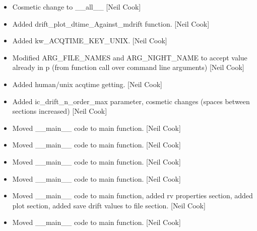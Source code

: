 \documentclass[a4paper,10pt,english]{report}
\begin{document}
\begin{itemize}
\item {} 
Cosmetic change to \_\_all\_\_ {[}Neil Cook{]}

\item {} 
Added drift\_plot\_dtime\_Against\_mdrift function. {[}Neil Cook{]}

\item {} 
Added kw\_ACQTIME\_KEY\_UNIX. {[}Neil Cook{]}

\item {} 
Modified ARG\_FILE\_NAMES and ARG\_NIGHT\_NAME to accept value already in
p (from function call over command line arguments) {[}Neil Cook{]}

\item {} 
Added human/unix acqtime getting. {[}Neil Cook{]}

\item {} 
Added ic\_drift\_n\_order\_max parameter, cosmetic changes (spaces between
sections increased) {[}Neil Cook{]}

\item {} 
Moved \_\_main\_\_ code to main function. {[}Neil Cook{]}

\item {} 
Moved \_\_main\_\_ code to main function. {[}Neil Cook{]}

\item {} 
Moved \_\_main\_\_ code to main function. {[}Neil Cook{]}

\item {} 
Moved \_\_main\_\_ code to main function. {[}Neil Cook{]}

\item {} 
Moved \_\_main\_\_ code to main function, added rv properties section,
added plot section, added save drift values to file section. {[}Neil
Cook{]}

\item {} 
Moved \_\_main\_\_ code to main function. {[}Neil Cook{]}

\end{itemize}
\end{document}
